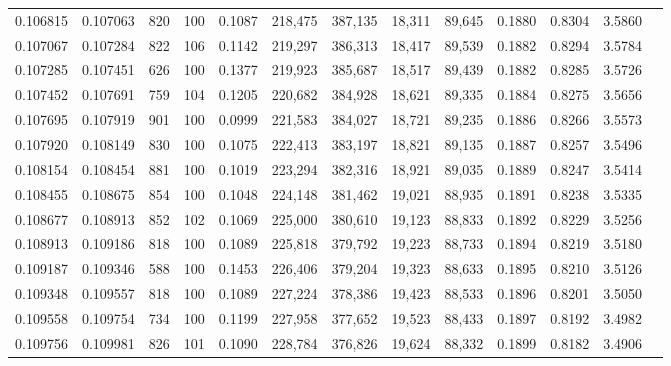 \begin{tabular}{rrrrrrrrrrrrr}
0.106815 & 0.107063 &   820 & 100 &                                     0.1087 & 218,475 & 387,135 &  18,311 &  89,645 & 0.1880 & 0.8304 & 3.5860 \\
0.107067 & 0.107284 &   822 & 106 &                                     0.1142 & 219,297 & 386,313 &  18,417 &  89,539 & 0.1882 & 0.8294 & 3.5784 \\
0.107285 & 0.107451 &   626 & 100 &                                     0.1377 & 219,923 & 385,687 &  18,517 &  89,439 & 0.1882 & 0.8285 & 3.5726 \\
0.107452 & 0.107691 &   759 & 104 &                                     0.1205 & 220,682 & 384,928 &  18,621 &  89,335 & 0.1884 & 0.8275 & 3.5656 \\
0.107695 & 0.107919 &   901 & 100 &                                     0.0999 & 221,583 & 384,027 &  18,721 &  89,235 & 0.1886 & 0.8266 & 3.5573 \\
0.107920 & 0.108149 &   830 & 100 &                                     0.1075 & 222,413 & 383,197 &  18,821 &  89,135 & 0.1887 & 0.8257 & 3.5496 \\
0.108154 & 0.108454 &   881 & 100 &                                     0.1019 & 223,294 & 382,316 &  18,921 &  89,035 & 0.1889 & 0.8247 & 3.5414 \\
0.108455 & 0.108675 &   854 & 100 &                                     0.1048 & 224,148 & 381,462 &  19,021 &  88,935 & 0.1891 & 0.8238 & 3.5335 \\
0.108677 & 0.108913 &   852 & 102 &                                     0.1069 & 225,000 & 380,610 &  19,123 &  88,833 & 0.1892 & 0.8229 & 3.5256 \\
0.108913 & 0.109186 &   818 & 100 &                                     0.1089 & 225,818 & 379,792 &  19,223 &  88,733 & 0.1894 & 0.8219 & 3.5180 \\
0.109187 & 0.109346 &   588 & 100 &                                     0.1453 & 226,406 & 379,204 &  19,323 &  88,633 & 0.1895 & 0.8210 & 3.5126 \\
0.109348 & 0.109557 &   818 & 100 &                                     0.1089 & 227,224 & 378,386 &  19,423 &  88,533 & 0.1896 & 0.8201 & 3.5050 \\
0.109558 & 0.109754 &   734 & 100 &                                     0.1199 & 227,958 & 377,652 &  19,523 &  88,433 & 0.1897 & 0.8192 & 3.4982 \\
0.109756 & 0.109981 &   826 & 101 &                                     0.1090 & 228,784 & 376,826 &  19,624 &  88,332 & 0.1899 & 0.8182 & 3.4906 \\

\end{tabular}
